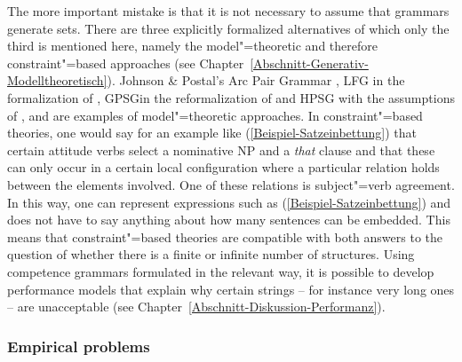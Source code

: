 The more important mistake is that it is not necessary to assume that grammars generate
sets. There are three explicitly formalized alternatives of which only the third is mentioned here,
namely the model"=theoretic and therefore constraint"=based approaches (see 
Chapter~\ref{Abschnitt-Generativ-Modelltheoretisch}). Johnson \& Postal's Arc Pair Grammar \citeyearpar{JP80a-u}, LFG\indexlfg
in the formalization of \citet{Kaplan95a}, GPSG\indexgpsg in the reformalization of \citet{Rogers97a-andere-anfuhrungszeichen} and HPSG\indexhpsg
with the assumptions of \citet{King99a-u}, \citet{Pollard99a} and \citet{Richter2007a} are examples of model"=theoretic approaches.
In constraint"=based theories, one would say for an example like (\ref{Beispiel-Satzeinbettung}) that certain attitude verbs select a nominative NP and a 
\emph{that} clause and that these can only occur in a certain local configuration where a particular relation holds between the elements involved.
One of these relations is subject"=verb agreement. In this way, one can represent expressions such as (\ref{Beispiel-Satzeinbettung})
and does not have to say anything about how many sentences can be embedded.
This means that constraint"=based theories are compatible with both answers to the question of whether there is a finite or infinite number of structures.
Using competence grammars formulated in the relevant way, it is possible to develop performance
models that explain why certain strings -- for instance very long ones -- are unacceptable
(see Chapter~\ref{Abschnitt-Diskussion-Performanz}).

\subsubsection{Empirical problems}

